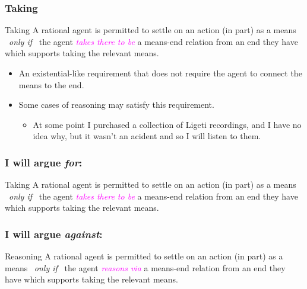 \documentclass[noamssymb,
]{beamer} %
\begin{document}
  \begin{frame}
    \frametitle{Taking}

  \begin{block}{Taking}
    A rational agent is permitted to settle on an action (in part) as a means
    \newline
    \mbox{ }\hfill\emph{only if}\hfill\mbox{ }
    \newline
    the agent \textcolor{fuchsia}{\emph{takes there to be}} a means-end relation from an end they have which supports taking the relevant means.
  \end{block}

  \begin{itemize}
  \item An existential-like requirement that does not require the agent to connect the means to the end.
  \item Some cases of reasoning may satisfy this requirement.
    \begin{itemize}
    \item At some point I purchased a collection of Ligeti recordings, and I have no idea why, but it wasn't an acident and so I will listen to them.
    \end{itemize}
  \end{itemize}
\end{frame}

\begin{frame}
  \frametitle{I will argue \emph{for}:}

  \begin{block}{Taking}
    A rational agent is permitted to settle on an action (in part) as a means
    \newline
    \mbox{ }\hfill\emph{only if}\hfill\mbox{ }
    \newline
    the agent \textcolor{fuchsia}{\emph{takes there to be}} a means-end relation from an end they have which supports taking the relevant means.
  \end{block}
\end{frame}


\begin{frame}
  \frametitle{I will argue \emph{against}:}

  \begin{block}{Reasoning}
    A rational agent is permitted to settle on an action (in part) as a means
    \newline
    \mbox{ }\hfill\emph{only if}\hfill\mbox{ }
    \newline
    the agent \textcolor{fuchsia}{\emph{reasons via}} a means-end relation from an end they have which supports taking the relevant means.
  \end{block}
\end{frame}
\end{document}
